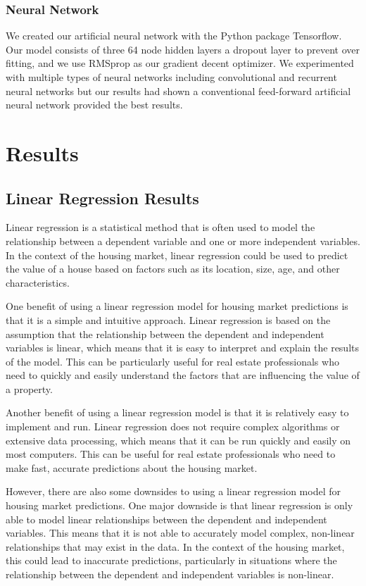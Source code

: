 \documentclass[11pt]{article}
\begin{document}
\subsubsection{Neural Network}

We created our artificial neural network with the Python package Tensorflow. Our model consists of three 64 node hidden layers a dropout layer to prevent over fitting, and we use RMSprop as our gradient decent optimizer. 
We experimented with multiple types of neural networks including convolutional and recurrent neural networks but our results had shown a conventional feed-forward artificial neural network provided the best results. 

\section{Results}
\subsection{Linear Regression Results}
Linear regression is a statistical method that is often used to model the relationship between a dependent variable and one or more independent variables. In the context of the housing market, linear regression could be used to predict the value of a house based on factors such as its location, size, age, and other characteristics.

One benefit of using a linear regression model for housing market predictions is that it is a simple and intuitive approach. Linear regression is based on the assumption that the relationship between the dependent and independent variables is linear, which means that it is easy to interpret and explain the results of the model. This can be particularly useful for real estate professionals who need to quickly and easily understand the factors that are influencing the value of a property.

Another benefit of using a linear regression model is that it is relatively easy to implement and run. Linear regression does not require complex algorithms or extensive data processing, which means that it can be run quickly and easily on most computers. This can be useful for real estate professionals who need to make fast, accurate predictions about the housing market.

However, there are also some downsides to using a linear regression model for housing market predictions. One major downside is that linear regression is only able to model linear relationships between the dependent and independent variables. This means that it is not able to accurately model complex, non-linear relationships that may exist in the data. In the context of the housing market, this could lead to inaccurate predictions, particularly in situations where the relationship between the dependent and independent variables is non-linear.
\end{document}
